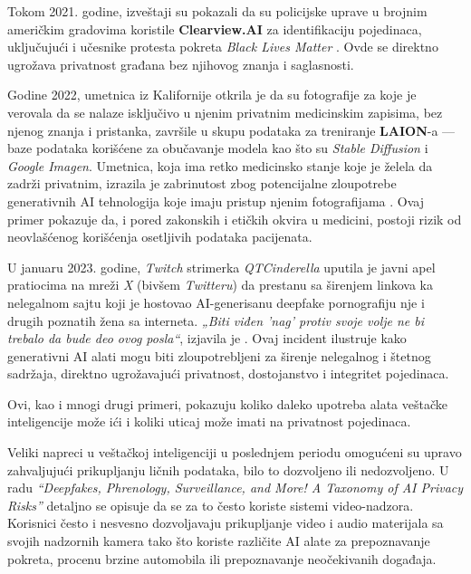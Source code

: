 \documentclass[a4paper,12pt]{article}
\begin{document}
Tokom 2021. godine, izveštaji su pokazali da su policijske uprave u brojnim američkim gradovima koristile \textbf{Clearview.AI} za identifikaciju pojedinaca, uključujući i učesnike protesta pokreta \textit{Black Lives Matter} \cite{lee2024deepfakesphrenologysurveillancemore}. Ovde se direktno ugrožava privatnost građana bez njihovog znanja i saglasnosti. 

Godine 2022, umetnica iz Kalifornije otkrila je da su fotografije za koje je verovala da se nalaze isključivo u njenim privatnim medicinskim zapisima, bez njenog znanja i pristanka, završile u skupu podataka za treniranje \textbf{LAION}-a — baze podataka korišćene za obučavanje modela kao što su \textit{Stable Diffusion} i \textit{Google Imagen}. Umetnica, koja ima retko medicinsko stanje koje je želela da zadrži privatnim, izrazila je zabrinutost zbog potencijalne zloupotrebe generativnih AI tehnologija koje imaju pristup njenim fotografijama \cite{lee2024deepfakesphrenologysurveillancemore}. Ovaj primer pokazuje da, i pored zakonskih i etičkih okvira u medicini, postoji rizik od neovlašćenog korišćenja osetljivih podataka pacijenata.

U januaru 2023. godine, \textit{Twitch} strimerka \textit{QTCinderella} uputila je javni apel pratiocima na mreži \textit{X} (bivšem \textit{Twitteru}) da prestanu sa širenjem linkova ka nelegalnom sajtu koji je hostovao AI-generisanu deepfake pornografiju nje i drugih poznatih žena sa interneta. \textit{„Biti viđen 'nag' protiv svoje volje ne bi trebalo da bude deo ovog posla“}, izjavila je \cite{lee2024deepfakesphrenologysurveillancemore}. Ovaj incident ilustruje kako generativni AI alati mogu biti zloupotrebljeni za širenje nelegalnog i štetnog sadržaja, direktno ugrožavajući privatnost, dostojanstvo i integritet pojedinaca.

Ovi, kao i mnogi drugi primeri, pokazuju koliko daleko upotreba alata veštačke inteligencije može ići i koliki uticaj može imati na privatnost pojedinaca.

Veliki napreci u veštačkoj inteligenciji u poslednjem periodu omogućeni su upravo zahvaljujući prikupljanju ličnih podataka, bilo to dozvoljeno ili nedozvoljeno. U radu \textit{"`Deepfakes, Phrenology, Surveillance, and More! A Taxonomy of AI Privacy Risks"'} \cite{lee2024deepfakesphrenologysurveillancemore} detaljno se opisuje da se za to često koriste sistemi video-nadzora. Korisnici često i nesvesno dozvoljavaju prikupljanje video i audio materijala sa svojih nadzornih kamera tako što koriste različite AI alate za prepoznavanje pokreta, procenu brzine automobila ili prepoznavanje neočekivanih događaja.
\end{document}
